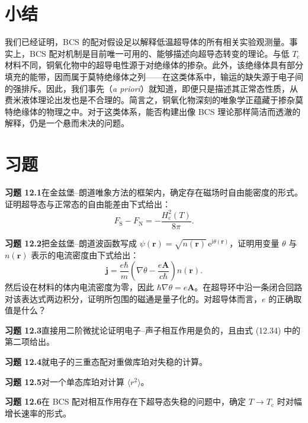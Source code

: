 \section*{小结}

我们已经证明，BCS 的配对假设足以解释低温超导体的所有相关实验观测量。事实上，BCS 配对机制是目前唯一可用的、能够描述向超导态转变的理论。与低 $T_{\mathrm{c}}$ 材料不同，铜氧化物中的超导电性源于对绝缘体的掺杂。此外，该绝缘体具有部分填充的能带，因而属于莫特绝缘体之列——在这类体系中，输运的缺失源于电子间的强排斥。因此，我们事先（\emph{a priori}）就知道，即便只是描述其正常态性质，从费米液体理论出发也是不合理的。简言之，铜氧化物深刻的唯象学正蕴藏于掺杂莫特绝缘体的物理之中。对于这类体系，能否构建出像 BCS 理论那样简洁而透澈的解释，仍是一个悬而未决的问题。

\section*{习题}

\textbf{习题 12.1}\quad 在金兹堡–朗道唯象方法的框架内，确定存在磁场时自由能密度的形式。证明超导态与正常态的自由能差由下式给出：
\begin{equation*}
F_{\mathrm{S}}-F_{\mathrm{N}}=-\frac{H_{\mathrm{c}}^{2}(T)}{8\pi}.\tag{12.327}
\end{equation*}

\textbf{习题 12.2}\quad 把金兹堡–朗道波函数写成 $\psi(\mathbf{r})=\sqrt{n(\mathbf{r})}\,\mathrm{e}^{\mathrm{i}\theta(\mathbf{r})}$，证明用变量 $\theta$ 与 $n(\mathbf{r})$ 表示的电流密度由下式给出：
\begin{equation*}
\mathbf{j}=\frac{e\hbar}{m}\left(\nabla\theta-\frac{e\mathbf{A}}{c\hbar}\right)n(\mathbf{r}).\tag{12.328}
\end{equation*}
然后设在材料的体内电流密度为零，因此 $\hbar\nabla\theta=e\mathbf{A}$。在超导环中沿一条闭合回路对该表达式两边积分，证明所包围的磁通是量子化的。对超导体而言，$e$ 的正确取值是什么？

\textbf{习题 12.3}\quad 直接用二阶微扰论证明电子–声子相互作用是负的，且由式 (12.34) 中的第二项给出。

\textbf{习题 12.4}\quad 就电子的三重态配对重做库珀对失稳的计算。

\textbf{习题 12.5}\quad 对一个单态库珀对计算 $\langle r^{2}\rangle$。

\textbf{习题 12.6}\quad 在 BCS 配对相互作用存在下超导态失稳的问题中，确定 $T\to T_{\mathrm{c}}$ 时对幅增长速率的形式。

